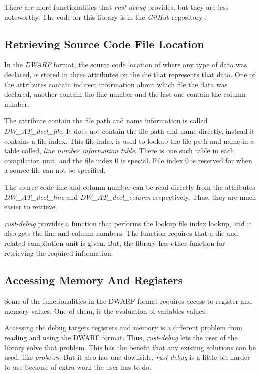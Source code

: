 There are more functionalities that \emph{rust-debug} provides, but they are less noteworthy.
The code for this library is in the \emph{GitHub} repository \cite{rust-debug}.



\subsection{Retrieving Source Code File Location} \label{sec:decl}
In the \emph{DWARF} format, the source code location of where any type of data was declared, is stored in three attributes on the \gls{die} that represents that data.
One of the attributes contain indirect information about which file the data was declared, another contain the line number and the last one contain the column number.


The attribute contain the file path and name information is called \emph{DW\_AT\_decl\_file}.
It does not contain the file path and name directly, instead it contains a file index.
This file index is used to lookup the file path and name in a table called, \emph{line number information table}.
There is one such table in each compilation unit, and the file index $0$ is special.
File index $0$ is reserved for when a source file can not be specified.


The source code line and column number can be read directly from the attributes \emph{DW\_AT\_decl\_line} and \emph{DW\_AT\_decl\_column} respectively.
Thus, they are much easier to retrieve.


\emph{rust-debug} provides a function that performs the lookup file index lookup, and it also gets the line and column numbers.
The function requires that a \gls{die} and related compilation unit is given.
But, the library has other function for retrieving the required information.


\subsection{Accessing Memory And Registers}
Some of the functionalities in the \gls{DWARF} format requires access to register and memory values.
One of them, is the evaluation of variables values.


Accessing the debug targets registers and memory is a different problem from reading and using the \gls{DWARF} format.
Thus, \emph{rust-debug} lets the user of the library solve that problem.
This has the benefit that any existing solutions can be used, like \emph{probe-rs}.
But it also has one downside, \emph{rust-debug} is a little bit harder to use because of extra work the user has to do.


